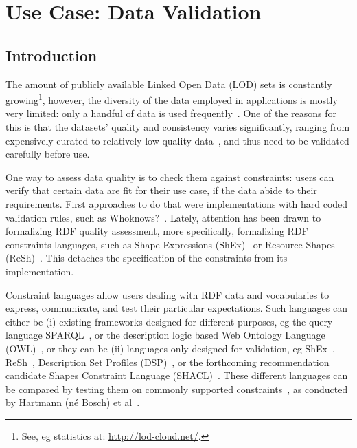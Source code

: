 \section{Use Case: Data Validation}

\subsection{Introduction}

The amount of publicly available Linked Open Data (LOD) sets is constantly growing\footnote{See, eg statistics at: \url{http://lod-cloud.net/}.},
however, the diversity of the data employed in applications is mostly very limited:
only a handful of \rdf data is used frequently~\cite{rietveld2015lod}.
One of the reasons for this is that the datasets' quality and consistency varies significantly,
ranging from expensively curated to relatively low quality data~\cite{zaveri2015quality},
and thus need to be validated carefully before use.

One way to assess data quality is to check them against constraints: 
users can verify that certain data are fit for their use case,
if the data abide to their requirements.
First approaches to do that were implementations with hard coded validation rules,
such as Whoknows?~\cite{ketterl2011whoknows}.
Lately, attention has been drawn to formalizing RDF quality assessment, more specifically,
formalizing RDF constraints languages, such as Shape Expressions (ShEx)~\cite{shex} or Resource Shapes (ReSh)~\cite{resh}.
This detaches the specification of the constraints from its implementation.

Constraint languages allow users dealing with RDF data and vocabularies
to express, communicate, and test their particular expectations.
Such languages can either be (i) existing frameworks designed for different purposes, eg 
the query language SPARQL~\cite{hartmann2016,kontokostas2014test},
or the description logic based Web Ontology Language (OWL)~\cite{owlValidation},
or they can be (ii) languages only designed for validation, eg
ShEx~\cite{shex},
ReSh~\cite{resh},
Description Set Profiles (DSP)~\cite{dsp},
or the forthcoming \wwwc recommendation candidate Shapes Constraint Language (SHACL)~\cite{shacl}.
These different languages can be compared
by testing them on commonly supported constraints~\cite{bosch2015rdf,kontokostas2014test},
as conducted by Hartmann (n\'e Bosch) et al~\cite{bosch2015}.

